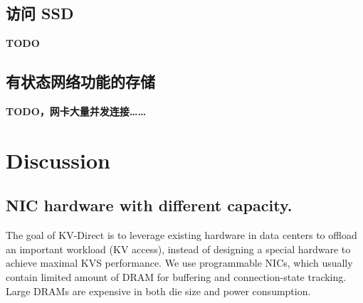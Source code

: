 \subsection{访问 SSD}

\textbf{TODO}


\subsection{有状态网络功能的存储}

\textbf{TODO，网卡大量并发连接……}


\section{Discussion}
\label{kvdirect:sec:discussion}

\subsection{NIC hardware with different capacity.}
\label{kvdirect:sec:different-nic}

The goal of KV-Direct is to leverage existing hardware in data centers to offload an important workload (KV access), instead of designing a special hardware to achieve maximal KVS performance. We use programmable NICs, which usually contain limited amount of DRAM for buffering and connection-state tracking. Large DRAMs are expensive in both die size and power consumption.

\begin{table}[t]
\centering
{}
\caption{Optimal load dispatch ratio for long-tail workload under different NIC DRAM/PCIe throughput ratio (vertical) and NIC/host memory size ratio (horizontal).}
\label{kvdirect:tab:optimal-load-dispatch}

\end{table}

